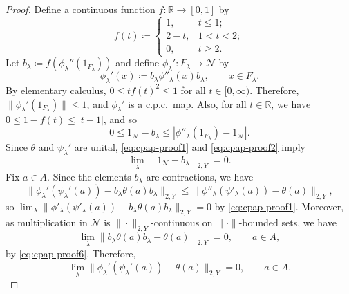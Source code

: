 \documentclass[a4paper,11pt]{amsart}
\theoremstyle{definition}
\numberwithin{equation}{section}
\numberwithin{theorem}{section}
\begin{document}
\begin{proof}
	Define a continuous function  $f \colon \mathbb R \rightarrow [0,1]$ by
\begin{equation}
		f(t) \coloneqq \begin{cases} 1, & t \leq 1; \\ 2 - t, & 1 < t < 2; \\ 0, & t \geq 2. \end{cases}
	\end{equation}
	Let $b_\lambda \coloneqq f(\phi_\lambda''(1_{F_\lambda}))$ and define $\phi_\lambda' \colon F_\lambda \rightarrow \mathcal N$ by
	\begin{equation}
		\phi_\lambda'(x) \coloneqq b_\lambda \phi''_\lambda(x) b_\lambda, \qquad x \in F_\lambda.
	\end{equation}
	By elementary calculus, $0 \leq t f(t)^2 \leq 1$ for all $t \in [0,\infty)$. Therefore, $\|\phi_\lambda'(1_{F_\lambda})\| \leq 1$, and $\phi_\lambda'$ is a c.p.c.\ map.
	Also, for all $t \in \mathbb R$, we have $0 \leq 1 - f(t) \leq |t - 1|$, and so
	\begin{equation}\label{eq:cpap-proof2}
		0 \leq 1_\mathcal N - b_\lambda \leq |\phi''_\lambda(1_{F_\lambda}) - 1_\mathcal N|.
	\end{equation}
	Since $\theta$ and $\psi_\lambda'$ are unital, \eqref{eq:cpap-proof1} and \eqref{eq:cpap-proof2} imply
	\begin{equation}\label{eq:cpap-proof6}
		\lim_\lambda \|1_\mathcal N - b_\lambda\|_{2, Y} = 0.
	\end{equation}
	Fix $a \in A$. Since the elements $b_\lambda$ are contractions, we have 
	\begin{equation}
		\| \phi_\lambda'(\psi_\lambda'(a)) - b_\lambda \theta(a)b_\lambda  \|_{2, Y} 
		\leq \|\phi''_\lambda(\psi'_\lambda(a)) - \theta(a)\|_{2,Y},	
	\end{equation}
	so $\lim_\lambda \| \phi'_\lambda(\psi'_\lambda(a)) - b_\lambda \theta(a)b_\lambda  \|_{2, Y} = 0$ by \eqref{eq:cpap-proof1}. Moreover, as multiplication in $\mathcal{N}$ is $\|\cdot\|_{2,Y}$-continuous on $\|\cdot\|$-bounded sets, we have 
	\begin{equation}	
	\lim_\lambda \| b_\lambda \theta(a)b_\lambda - \theta(a) \|_{2, Y} = 0, \qquad a \in A,
	\end{equation}
	by \eqref{eq:cpap-proof6}. Therefore, 
	\begin{equation}\label{eq:cpap-proof7}
		\lim_\lambda \|\phi_\lambda'(\psi_\lambda'(a)) - \theta(a)\|_{2, Y} = 0, \qquad a \in A.
	\end{equation}
	

\end{proof}
\end{document}
